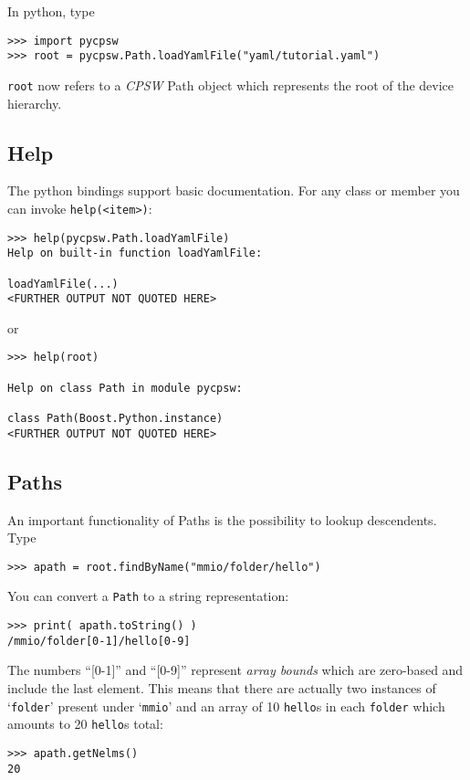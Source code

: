 \documentclass[10pt]{article}
\newcommand{\ita}[1]{\emph{#1}}
\newcommand{\cpsw}      {\ita {CPSW}}
\newcommand{\Path}      {{Path}}
\newcommand{\Paths}     {{Paths}}
\newcommand{\py}        {python}
\newcommand{\cod}[1] {{\tt#1}}
\begin{document}
In \py{}, type

\begin{verbatim}
>>> import pycpsw
>>> root = pycpsw.Path.loadYamlFile("yaml/tutorial.yaml")
\end{verbatim}

\cod{root} now refers to a \cpsw{} \Path{} object which represents
the root of the device hierarchy.

\subsection{Help}
The \py{} bindings support basic documentation. For any class or member
you can invoke \cod{help(<item>)}:
\begin{verbatim}
>>> help(pycpsw.Path.loadYamlFile)
Help on built-in function loadYamlFile:

loadYamlFile(...)
<FURTHER OUTPUT NOT QUOTED HERE>
\end{verbatim}
or
\begin{verbatim}
>>> help(root)

Help on class Path in module pycpsw:

class Path(Boost.Python.instance)
<FURTHER OUTPUT NOT QUOTED HERE>
\end{verbatim}

\subsection{Paths}

An important functionality of \Paths{} is the possibility to lookup
descendents. Type

\begin{verbatim}
>>> apath = root.findByName("mmio/folder/hello")
\end{verbatim}

You can convert a \cod{Path} to a string representation:

\begin{verbatim}
>>> print( apath.toString() )
/mmio/folder[0-1]/hello[0-9]
\end{verbatim}

The numbers ``[0-1]'' and ``[0-9]'' represent {\em array bounds} which 
are zero-based and include the last element. This means that there are
actually two instances of `\cod{folder}' present under `\cod{mmio}' and
an array of 10 \cod{hello}s in each \cod{folder} which amounts to
20 \cod{hello}s total:

\begin{verbatim}
>>> apath.getNelms()
20
\end{verbatim}
\end{document}
